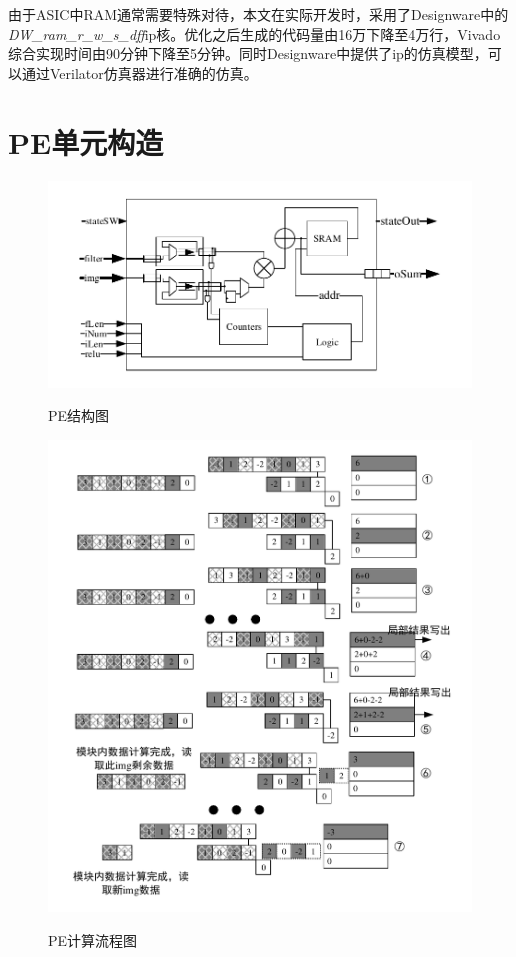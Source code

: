 由于ASIC中RAM通常需要特殊对待，本文在实际开发时，采用了Designware中的\emph{DW\_ram\_r\_w\_s\_dff}ip核。优化之后生成的代码量由16万下降至4万行，Vivado综合实现时间由90分钟下降至5分钟。同时Designware中提供了ip的仿真模型，可以通过Verilator仿真器进行准确的仿真。


\section{PE单元构造}
\begin{figure}[h]
    \centering
    \includegraphics{../pdf/PE.pdf}\\
    \caption{PE结构图}
\end{figure}
\begin{figure}[h]
    \centering
    \includegraphics{../pdf/pe_cal.pdf}\\
    \caption{PE计算流程图}
    \label{pe_cal}
\end{figure}
